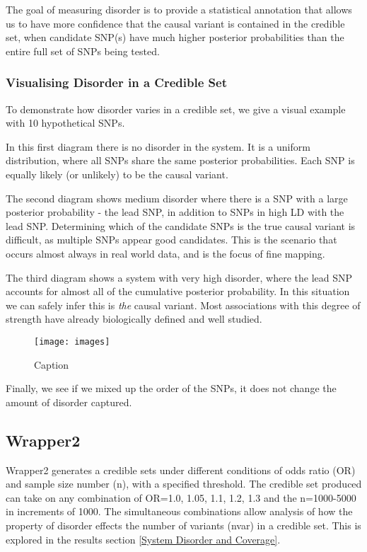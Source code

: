 The goal of measuring disorder is to provide a statistical annotation that allows us to have more confidence that the causal variant is contained in the credible set, when candidate SNP(s) have much higher posterior probabilities than the entire full set of SNPs being tested. 

\subsubsection{Visualising Disorder in a Credible Set} \label{Visualising Disorder in a Credible Set}
To demonstrate how disorder varies in a credible set, we give a visual example with 10 hypothetical SNPs. 

In this first diagram there is no disorder in the system. It is a uniform distribution, where all SNPs share the same posterior probabilities. Each SNP is equally likely (or unlikely) to be the causal variant. 


The second diagram shows medium disorder where there is a SNP with a large posterior probability - the lead SNP, in addition to SNPs in high LD with the lead SNP. Determining which of the candidate SNPs is the true causal variant is difficult, as multiple SNPs appear good candidates. This is the scenario that occurs almost always in real world data, and is the focus of fine mapping. 

The third diagram shows a system with very high disorder, where the lead SNP accounts for almost all of the cumulative posterior probability. In this situation we can safely infer this is \emph{the} causal variant. Most associations with this degree of strength have already biologically defined and well studied. 

\begin{figure}
    \centering
    \texttt{[image: images]}
    \caption{Caption}
    \label{fig:my_label}
\end{figure}
Finally, we see if we mixed up the order of the SNPs, it does not change the amount of disorder captured. 


\subsection{Wrapper2} \label{Wrapper2}
Wrapper2 generates a  credible sets under different conditions of odds ratio (OR) and sample size number (n), with a specified threshold. The credible set produced can take on any combination of OR=1.0, 1.05, 1.1, 1.2, 1.3 and the n=1000-5000 in increments of 1000. The simultaneous combinations allow analysis of how the property of disorder effects the number of variants (nvar) in a credible set. This is explored in the results section \ref{System Disorder and Coverage}. 

